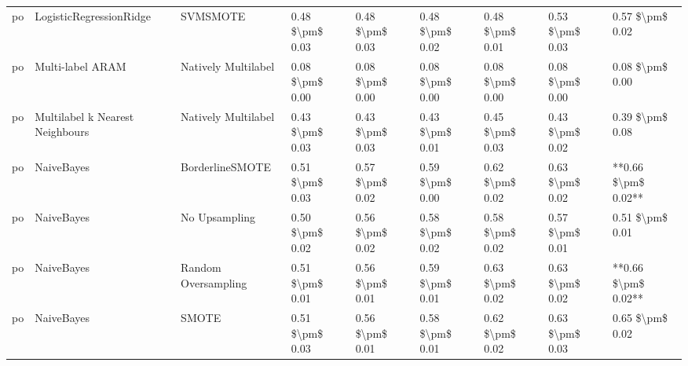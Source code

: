 \begin{tabular}{lllllllll}
      po &         LogisticRegressionRidge &                      SVMSMOTE & 0.48 \$\textbackslash pm\$ 0.03 &           0.48 \$\textbackslash pm\$ 0.03 &       0.48 \$\textbackslash pm\$ 0.02 &        0.48 \$\textbackslash pm\$ 0.01 &                         0.53 \$\textbackslash pm\$ 0.03 &     0.57 \$\textbackslash pm\$ 0.02 \\
      po &                Multi-label ARAM &           Natively Multilabel & 0.08 \$\textbackslash pm\$ 0.00 &           0.08 \$\textbackslash pm\$ 0.00 &       0.08 \$\textbackslash pm\$ 0.00 &        0.08 \$\textbackslash pm\$ 0.00 &                         0.08 \$\textbackslash pm\$ 0.00 &     0.08 \$\textbackslash pm\$ 0.00 \\
      po & Multilabel k Nearest Neighbours &           Natively Multilabel & 0.43 \$\textbackslash pm\$ 0.03 &           0.43 \$\textbackslash pm\$ 0.03 &       0.43 \$\textbackslash pm\$ 0.01 &        0.45 \$\textbackslash pm\$ 0.03 &                         0.43 \$\textbackslash pm\$ 0.02 &     0.39 \$\textbackslash pm\$ 0.08 \\
      po &                      NaiveBayes &               BorderlineSMOTE & 0.51 \$\textbackslash pm\$ 0.03 &           0.57 \$\textbackslash pm\$ 0.02 &       0.59 \$\textbackslash pm\$ 0.00 &        0.62 \$\textbackslash pm\$ 0.02 &                         0.63 \$\textbackslash pm\$ 0.02 & **0.66 \$\textbackslash pm\$ 0.02** \\
      po &                      NaiveBayes &                 No Upsampling & 0.50 \$\textbackslash pm\$ 0.02 &           0.56 \$\textbackslash pm\$ 0.02 &       0.58 \$\textbackslash pm\$ 0.02 &        0.58 \$\textbackslash pm\$ 0.02 &                         0.57 \$\textbackslash pm\$ 0.01 &     0.51 \$\textbackslash pm\$ 0.01 \\
      po &                      NaiveBayes &           Random Oversampling & 0.51 \$\textbackslash pm\$ 0.01 &           0.56 \$\textbackslash pm\$ 0.01 &       0.59 \$\textbackslash pm\$ 0.01 &        0.63 \$\textbackslash pm\$ 0.02 &                         0.63 \$\textbackslash pm\$ 0.02 & **0.66 \$\textbackslash pm\$ 0.02** \\
      po &                      NaiveBayes &                         SMOTE & 0.51 \$\textbackslash pm\$ 0.03 &           0.56 \$\textbackslash pm\$ 0.01 &       0.58 \$\textbackslash pm\$ 0.01 &        0.62 \$\textbackslash pm\$ 0.02 &                         0.63 \$\textbackslash pm\$ 0.03 &     0.65 \$\textbackslash pm\$ 0.02 \\

\end{tabular}
